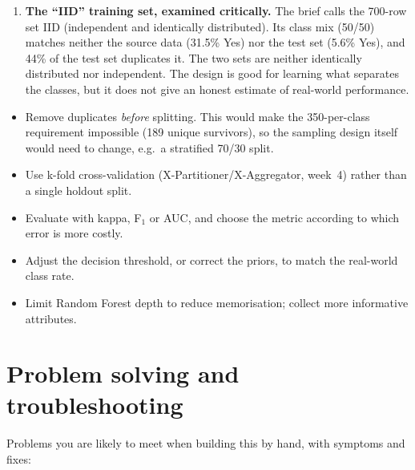 \documentclass[11pt,a4paper]{article}
\begin{document}
\begin{enumerate}[leftmargin=*]
\item \textbf{The ``IID'' training set, examined critically.} The brief calls the 700-row set IID (independent and
  identically distributed). Its class mix (50/50) matches neither the source data (31.5\% Yes) nor the test set
  (5.6\% Yes), and 44\% of the test set duplicates it. The two sets are neither identically distributed nor
  independent. The design is good for learning what separates the classes, but it does not give an honest estimate of
  real-world performance.
\end{enumerate}

\begin{keypoint}[Suggestions]
\begin{itemize}
  \item Remove duplicates \emph{before} splitting. This would make the 350-per-class requirement impossible (189 unique
        survivors), so the sampling design itself would need to change, e.g.\ a stratified 70/30 split.
  \item Use k-fold cross-validation (X-Partitioner/X-Aggregator, week~4) rather than a single holdout split.
  \item Evaluate with kappa, F$_1$ or AUC, and choose the metric according to which error is more costly.
  \item Adjust the decision threshold, or correct the priors, to match the real-world class rate.
  \item Limit Random Forest depth to reduce memorisation; collect more informative attributes.
\end{itemize}
\end{keypoint}

\section{Problem solving and troubleshooting}
Problems you are likely to meet when building this by hand, with symptoms and fixes:
\end{document}
